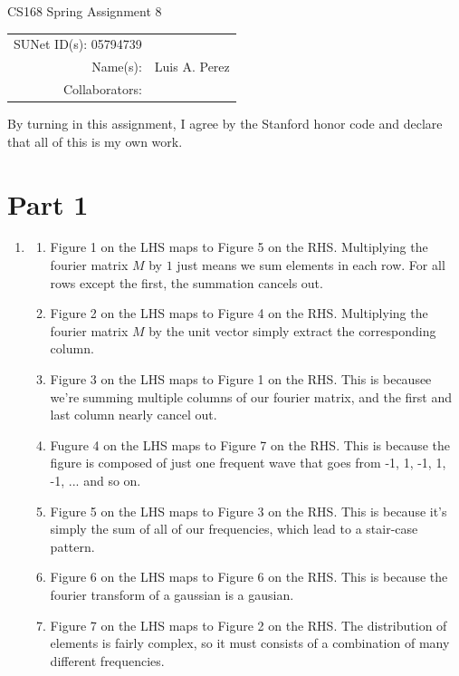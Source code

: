 \documentclass[12pt]{article}
\begin{document}
\begin{center}
{\Large CS168 Spring Assignment 8}

\begin{tabular}{rl}
SUNet ID(s): 05794739 & \\
Name(s): & Luis A. Perez \\
Collaborators: &
\end{tabular}
\end{center}

By turning in this assignment, I agree by the Stanford honor code and declare
that all of this is my own work.

\section*{Part 1}

\begin{enumerate}[label=(\alph*)]
  \item
    \begin{enumerate}
      \item Figure 1 on the LHS maps to Figure 5 on the RHS. Multiplying the fourier matrix $M$ by $1$ just means we sum elements in each row. For all rows except the first, the summation cancels out. 
      \item Figure 2 on the LHS maps to Figure 4 on the RHS. Multiplying the fourier matrix $M$ by the unit vector simply extract the corresponding column.
      \item Figure 3 on the LHS maps to Figure 1 on the RHS. This is becausee we're summing multiple columns of our fourier matrix, and the first and last column nearly cancel out.
      \item Fugure 4 on the LHS maps to Figure 7 on the RHS. This is because the figure is composed of just one frequent wave that goes from -1, 1, -1, 1, -1, ... and so on.
      \item Figure 5 on the LHS maps to Figure 3 on the RHS. This is because it's simply the sum of all of our frequencies, which lead to a stair-case pattern.
      \item Figure 6 on the LHS maps to Figure 6 on the RHS. This is because the fourier transform of a gaussian is a gausian.
      \item Figure 7 on the LHS maps to Figure 2 on the RHS. The distribution of elements is fairly complex, so it must consists of a combination of many different frequencies.
    \end{enumerate}
\end{enumerate}
\end{document}
